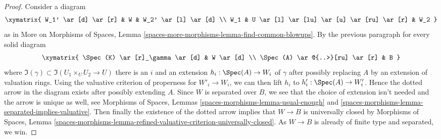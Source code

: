 \begin{proof}
\medskip\noindent
Consider a diagram
$$
\xymatrix{
W_1' \ar[d] \ar[r] & W & W_2' \ar[l] \ar[d] \\
W_1 & U \ar[l] \ar[lu] \ar[u] \ar[ru] \ar[r] & W_2
}
$$
as in More on Morphisms of Spaces, Lemma
\ref{spaces-more-morphisms-lemma-find-common-blowups}.
By the previous paragraph for every solid diagram
$$
\xymatrix{
\Spec(K) \ar[r]_\gamma  \ar[d] & W \ar[d] \\
\Spec(A) \ar@{..>}[ru] \ar[r] & B
}
$$
where $\Im(\gamma) \subset \Im(U_1 \times_U U_2 \to U)$
there is an $i$ and an extension $h_i : \Spec(A) \to W_i$ of $\gamma$
after possibly replacing $A$ by an extension of valuation rings.
Using the valuative criterion of properness for $W'_i \to W_i$,
we can then lift $h_i$ to $h'_i : \Spec(A) \to W'_i$.
Hence the dotted arrow in the diagram exists after possibly
extending $A$. Since $W$ is separated over $B$, we see that the choice
of extension isn't needed and the arrow is unique as well, see
Morphisms of Spaces, Lemmas \ref{spaces-morphisms-lemma-usual-enough}
and \ref{spaces-morphisms-lemma-separated-implies-valuative}.
Then finally the existence of the dotted arrow
implies that $W \to B$ is universally closed by
Morphisms of Spaces, Lemma
\ref{spaces-morphisms-lemma-refined-valuative-criterion-universally-closed}.
As $W \to B$ is already of finite type and separated, we win.
\end{proof}
